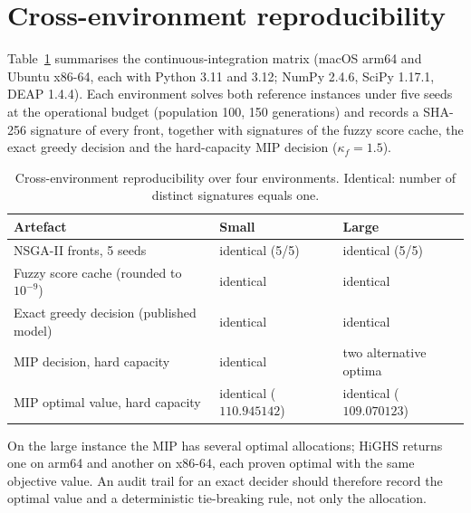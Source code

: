\documentclass[systems,article,submit,moreauthors,pdftex]{Definitions/mdpi}
\begin{document}
\section{Cross-environment reproducibility}\label{app:crossenv}
Table~\ref{tab:crossenv} summarises the continuous-integration matrix (macOS arm64 and Ubuntu
x86-64, each with Python 3.11 and 3.12; NumPy 2.4.6, SciPy 1.17.1, DEAP 1.4.4). Each
environment solves both reference instances under five seeds at the operational budget
(population 100, 150 generations) and records a SHA-256 signature of every front, together
with signatures of the fuzzy score cache, the exact greedy decision and the hard-capacity MIP
decision ($\kappa_f = 1.5$).

\begin{table}[H]
\centering
\caption{Cross-environment reproducibility over four environments. Identical: number of
distinct signatures equals one.\label{tab:crossenv}}
\small
\begin{tabular}{lll}
\toprule
Artefact & Small & Large\\
\midrule
NSGA-II fronts, 5 seeds & identical (5/5) & identical (5/5)\\
Fuzzy score cache (rounded to $10^{-9}$) & identical & identical\\
Exact greedy decision (published model) & identical & identical\\
MIP decision, hard capacity & identical & two alternative optima\\
MIP optimal value, hard capacity & identical ($110.945142$) & identical ($109.070123$)\\
\bottomrule
\end{tabular}
\end{table}

On the large instance the MIP has several optimal allocations; HiGHS returns one on arm64 and
another on x86-64, each proven optimal with the same objective value. An audit trail for an
exact decider should therefore record the optimal value and a deterministic tie-breaking rule,
not only the allocation.

\end{document}
